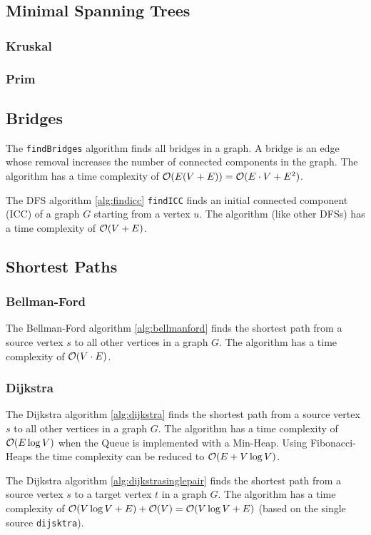 \documentclass{article}
\begin{document}
\subsection{Minimal Spanning Trees}
\subsubsection{Kruskal}


\subsubsection{Prim}


\subsection{Bridges}
The \texttt{findBridges} algorithm finds all bridges in a graph. A bridge is an edge whose removal increases the number of connected components in the graph. The algorithm has a time complexity of $\mathcal{O}(E(V+E))=\mathcal{O}(E\cdot V+E^2)$.\par

The DFS algorithm \ref{alg:findicc} \texttt{findICC} finds an initial connected component (ICC) of a graph $G$ starting from a vertex $u$. The algorithm (like other DFSs) has a time complexity of $\mathcal{O}(V+E)$.\par

\subsection{Shortest Paths}


\subsubsection{Bellman-Ford}
The Bellman-Ford algorithm \ref{alg:bellmanford} finds the shortest path from a source vertex $s$ to all other vertices in a graph $G$. The algorithm has a time complexity of $\mathcal{O}(V\cdot E)$.\par


\subsubsection{Dijkstra}
The Dijkstra algorithm \ref{alg:dijkstra} finds the shortest path from a source vertex $s$ to all other vertices in a graph $G$. The algorithm has a time complexity of $\mathcal{O}(E\log V)$ when the Queue is implemented with a Min-Heap. Using Fibonacci-Heaps the time complexity can be reduced to $\mathcal{O}(E+V\log V)$.\par


The Dijkstra algorithm \ref{alg:dijkstrasinglepair} finds the shortest path from a source vertex $s$ to a target vertex $t$ in a graph $G$. The algorithm has a time complexity of $\mathcal{O}(V\log V+E)+\mathcal{O}(V)=\mathcal{O}(V\log V+E)$ (based on the single source \texttt{dijsktra}).\par

\end{document}
